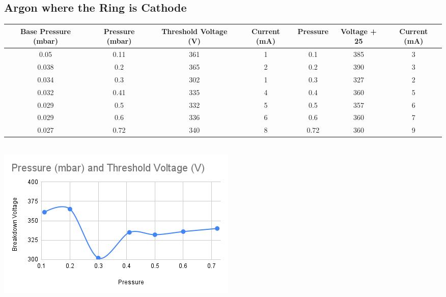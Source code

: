 \documentclass[]{report}[12 pt]
\begin{document}
\subsection{Argon where the Ring is Cathode}
\begin{center}
		\begin{tabular}{|c|c|c|c|c|c|c|}
		\hline
		Base Pressure (mbar) & Pressure (mbar) & Threshold Voltage (V) & Current (mA) & Pressure & Voltage + 25 & Current (mA) \\ \hline
		0.05                 & 0.11            & 361                   & 1            & 0.1      & 385          & 3            \\ \hline
		0.038                & 0.2             & 365                   & 2            & 0.2      & 390          & 3            \\ \hline
		0.034                & 0.3             & 302                   & 1            & 0.3      & 327          & 2            \\ \hline
		0.032                & 0.41            & 335                   & 4            & 0.4      & 360          & 5            \\ \hline
		0.029                & 0.5             & 332                   & 5            & 0.5      & 357          & 6            \\ \hline
		0.029                & 0.6             & 336                   & 6            & 0.6      & 360          & 7            \\ \hline
		0.027                & 0.72            & 340                   & 8            & 0.72     & 360          & 9            \\ \hline
	\end{tabular}\\
	\includegraphics[width=10 cm]{plasma1.png}
\end{center}

	
\end{document}
